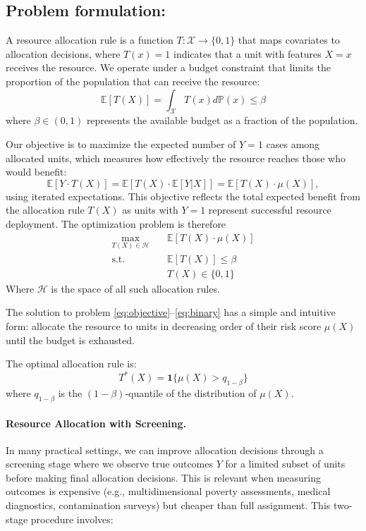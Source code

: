 \documentclass[11pt]{article}
\begin{document}
\subsection*{Problem formulation:}

A resource allocation rule is a function $T: \mathcal{X} \to \{0,1\}$ that maps covariates to allocation decisions, where $T(x)=1$ indicates that a unit with features $X=x$ receives the resource. We operate under a budget constraint that limits the proportion of the population that can receive the resource:
\begin{equation}
    \mathbb{E}[T(X)] = \int_{\mathcal{X}} T(x) d\mathbb{P}(x) \leq \beta
\end{equation}
where $\beta \in (0,1)$ represents the available budget as a fraction of the population.

Our objective is to maximize the expected number of $Y=1$ cases among allocated units, which measures how effectively the resource reaches those who would benefit:
\begin{equation}
  \mathbb{E}[Y \cdot T(X)] = \mathbb{E}[T(X) \cdot \mathbb{E}[Y|X]] = \mathbb{E}[T(X) \cdot \mu(X)],  
\end{equation}
using iterated expectations. This objective reflects the total expected benefit from the allocation rule $T(X)$ as units with $Y=1$ represent successful resource deployment. The optimization problem is therefore
\begin{align}
\max_{T(X) \in \mathcal{H}} &\quad \mathbb{E}[T(X) \cdot \mu(X)] \label{eq:objective}\\
\text{s.t.} &\quad \mathbb{E}[T(X)] \leq \beta \label{eq:budget}\\
&\quad T(X) \in \{0,1\} \label{eq:binary}
\end{align}
Where $\mathcal{H}$ is the space of all such allocation rules.

The solution to problem \eqref{eq:objective}--\eqref{eq:binary} has a simple and intuitive form: allocate the resource to units in decreasing order of their risk score $\mu(X)$ until the budget is exhausted.

\begin{theorem}
\label{thm:optimal_no_screening}
The optimal allocation rule is:
$$T^*(X) = \mathbf{1}\{\mu(X) > q_{1-\beta}\}$$
where $q_{1-\beta}$ is the $(1-\beta)$-quantile of the distribution of $\mu(X)$.
\end{theorem}

\paragraph{Resource Allocation with Screening.} In many practical settings, we can improve allocation decisions through a screening stage where we observe true outcomes $Y$ for a limited subset of units before making final allocation decisions. This is relevant when measuring outcomes is expensive (e.g., multidimensional poverty assessments, medical diagnostics, contamination surveys) but cheaper than full assignment. This two-stage procedure involves:
\end{document}
